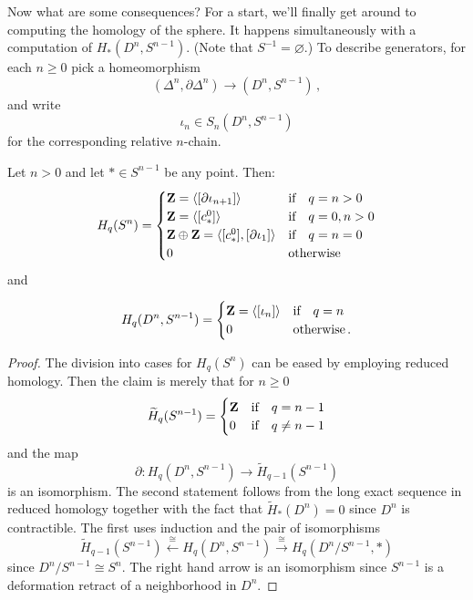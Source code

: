 Now what are some consequences? For a start, we'll finally get around
to computing the homology of the sphere. 
It happens simultaneously with a computation of 
$ H_\ast(D^n,S^{n-1})$. (Note that $S^{-1}=\varnothing$.)
To describe generators, for each $n\geq0$ pick a homeomorphism
\[
(\Delta^n,\partial\Delta^n)\to(D^n,S^{n-1})\,,
\]
and write 
\[
\iota_n\in S_n(D^n,S^{n-1})
\]
for the corresponding relative $n$-chain.
\begin{prop} Let $n>0$ and let $\ast\in S^{n-1}$ be any point. Then:
	 \begin{equation*}
	 H_q(S^n)=\begin{cases}
\mathbf Z = \langle[\partial\iota_{n+1}]\rangle & \hbox{if}\quad q=n>0 \\ 
\mathbf Z = \langle[c^0_\ast]\rangle & \hbox{if}\quad q=0,n>0\\ 
\mathbf Z\oplus\mathbf Z = \langle[c^0_\ast],[\partial\iota_1]\rangle & \hbox{if}\quad  q=n=0 \\
0 & \hbox{otherwise} \end{cases}
	\end{equation*}
and
	\item \begin{equation*}
	 H_q(D^n,S^{n-1}) = \begin{cases}
	\mathbf Z=\langle [\iota_n]\rangle & \hbox{if}\quad q=n\\
	0 & \hbox{otherwise}\,.
	\end{cases}
	\end{equation*}
\end{prop}

\begin{proof}
The division into cases for $H_q(S^n)$ can be eased by employing reduced 
homology. Then the claim is merely that for $n\geq0$
\[
\widetilde H_q(S^{n-1})=
\begin{cases}\mathbf Z & \hbox{if}\quad q=n-1 \\ 
0 & \hbox{if}\quad q\neq n-1\end{cases}
\]
and the map 
\[
\partial:H_q(D^n,S^{n-1})\to \widetilde H_{q-1}(S^{n-1})
\]
is an isomorphism.  The second statement follows from the long exact sequence
in reduced homology together with the fact that $\widetilde H_*(D^n)=0$ 
since $D^n$ is contractible. The first uses induction and the pair of
isomorphisms
\[
\widetilde H_{q-1}(S^{n-1}) \xleftarrow{\cong}H_q(D^n,S^{n-1})
\xrightarrow{\cong}H_q(D^n/S^{n-1},\ast)
\]
since $D^n/S^{n-1}\cong S^n$. The right hand arrow is an isomorphism 
since $S^{n-1}$ is a deformation retract of a neighborhood in $D^n$.
\end{proof}

